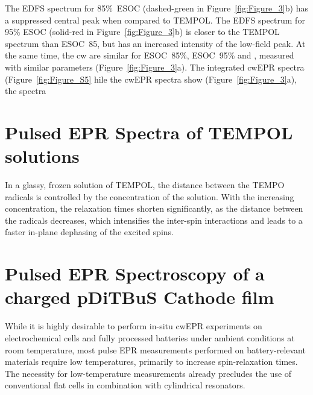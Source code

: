 The EDFS spectrum for 85\%~ESOC (dashed-green in Figure~\ref{fig:Figure_3}b) has a suppressed central peak when compared to  TEMPOL. The EDFS spectrum for 95\% ESOC (solid-red in Figure~\ref{fig:Figure_3}b) is closer to the TEMPOL spectrum than ESOC~85, but has an increased intensity of the low-field peak. At the same time, the cw are similar for ESOC~85\%, ESOC~95\% and , measured with similar parameters (Figure~\ref{fig:Figure_3}a). The integrated cwEPR spectra  (Figure~\ref{fig:Figure_S5}  hile the cwEPR spectra  show  (Figure~\ref{fig:Figure_3}a), the   spectra 










\section{Pulsed EPR Spectra of TEMPOL solutions}
In a glassy, frozen solution of TEMPOL, the distance between the TEMPO radicals is controlled by the concentration of the solution. With the increasing concentration, the relaxation times shorten significantly, as the distance between the radicals decreases, which intensifies the inter-spin interactions and leads to a faster in-plane dephasing of the excited spins. 

\section{Pulsed EPR Spectroscopy of a charged pDiTBuS Cathode film}

While it is highly desirable to perform in-situ cwEPR experiments on electrochemical cells and fully processed batteries under ambient conditions at room temperature, most pulse EPR measurements performed on battery-relevant materials require low temperatures, primarily to increase spin-relaxation times. The necessity for low-temperature measurements already precludes the use of conventional flat cells in combination with cylindrical resonators.\cite{wadhawan2007_encofelectrochem, toybenshlak2019_isrjchem}

